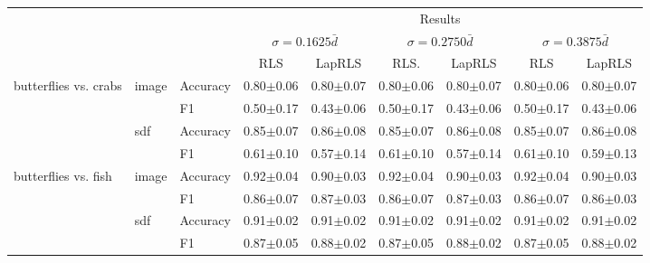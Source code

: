 \documentclass[anon,11pt]{9520} %
\begin{document}
\begin{table}
\scriptsize

\begin{center}
\begin{tabular}{l|l|l|cc|cc|cc|}
& & & \multicolumn{6}{c}{Results} \\ 
  & & & \multicolumn{2}{|c|}{$\sigma=0.1625 \bar{d}$}
       & \multicolumn{2}{|c|}{$\sigma=0.2750 \bar{d}$}
       & \multicolumn{2}{|c|}{$\sigma=0.3875 \bar{d}$}\\ 
& & & RLS & LapRLS & RLS. & LapRLS & RLS & LapRLS\\ \hline 

\multirow{4}{*}{butterflies vs. crabs}
& \multirow{2}{*}{image} & \multirow{1}{*}{Accuracy}& 0.80$\pm$0.06& 0.80$\pm$0.07& 0.80$\pm$0.06& 0.80$\pm$0.07& 0.80$\pm$0.06& 0.80$\pm$0.07\\ 
& & \multirow{1}{*}{F1}& 0.50$\pm$0.17& 0.43$\pm$0.06& 0.50$\pm$0.17& 0.43$\pm$0.06& 0.50$\pm$0.17& 0.43$\pm$0.06\\ \cline{2-9} 

& \multirow{2}{*}{sdf} & \multirow{1}{*}{Accuracy}& 0.85$\pm$0.07& 0.86$\pm$0.08& 0.85$\pm$0.07& 0.86$\pm$0.08& 0.85$\pm$0.07& 0.86$\pm$0.08\\ 
& & \multirow{1}{*}{F1}& 0.61$\pm$0.10& 0.57$\pm$0.14& 0.61$\pm$0.10& 0.57$\pm$0.14& 0.61$\pm$0.10& 0.59$\pm$0.13\\ \cline{2-9} 

\multirow{4}{*}{butterflies vs. fish}
& \multirow{2}{*}{image} & \multirow{1}{*}{Accuracy}& 0.92$\pm$0.04& 0.90$\pm$0.03& 0.92$\pm$0.04& 0.90$\pm$0.03& 0.92$\pm$0.04& 0.90$\pm$0.03\\ 
& & \multirow{1}{*}{F1}& 0.86$\pm$0.07& 0.87$\pm$0.03& 0.86$\pm$0.07& 0.87$\pm$0.03& 0.86$\pm$0.07& 0.86$\pm$0.03\\ \cline{2-9} 

& \multirow{2}{*}{sdf} & \multirow{1}{*}{Accuracy}& 0.91$\pm$0.02& 0.91$\pm$0.02& 0.91$\pm$0.02& 0.91$\pm$0.02& 0.91$\pm$0.02& 0.91$\pm$0.02\\ 
& & \multirow{1}{*}{F1}& 0.87$\pm$0.05& 0.88$\pm$0.02& 0.87$\pm$0.05& 0.88$\pm$0.02& 0.87$\pm$0.05& 0.88$\pm$0.02\\ \cline{2-9} 


\end{tabular}
\end{center}
\end{table}
\end{document}
